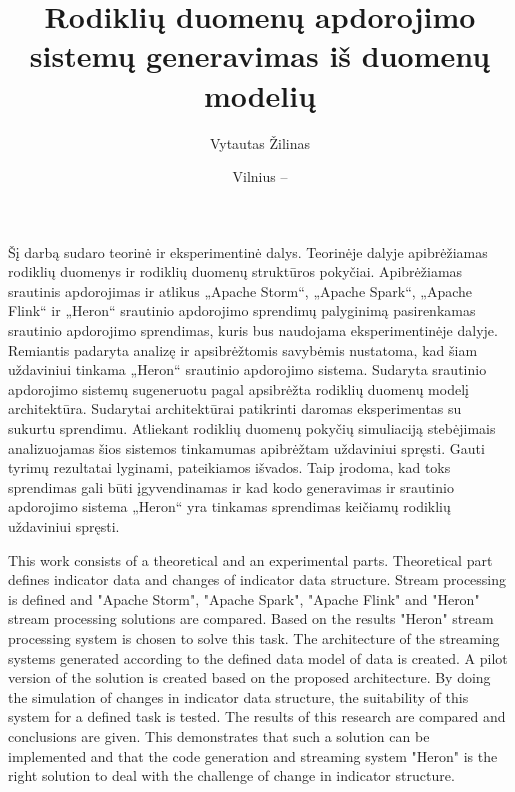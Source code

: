 \documentclass{VUMIFPSbakalaurinis}
\title{Rodiklių duomenų apdorojimo sistemų generavimas iš duomenų modelių}
\author{Vytautas Žilinas}
\date{Vilnius – \the\year}
\begin{document}
 
\maketitle

\cleardoublepage{}
\setcounter{page}{2}

Šį darbą sudaro teorinė ir eksperimentinė dalys. Teorinėje dalyje apibrėžiamas rodiklių duomenys ir rodiklių duomenų struktūros pokyčiai. Apibrėžiamas srautinis apdorojimas ir atlikus „Apache Storm“, „Apache Spark“, „Apache Flink“ ir „Heron“ srautinio apdorojimo sprendimų palyginimą pasirenkamas srautinio apdorojimo sprendimas, kuris bus naudojama eksperimentinėje dalyje. Remiantis padaryta analizę ir apsibrėžtomis savybėmis nustatoma, kad šiam uždaviniui tinkama „Heron“ srautinio apdorojimo sistema. Sudaryta srautinio apdorojimo sistemų sugeneruotu pagal apsibrėžta rodiklių duomenų modelį architektūra. Sudarytai architektūrai patikrinti daromas eksperimentas su sukurtu sprendimu. Atliekant rodiklių duomenų pokyčių simuliaciją stebėjimais analizuojamas šios sistemos tinkamumas apibrėžtam uždaviniui spręsti. Gauti tyrimų rezultatai lyginami, pateikiamos išvados. Taip įrodoma, kad toks sprendimas gali būti įgyvendinamas ir kad kodo generavimas ir srautinio apdorojimo sistema „Heron“ yra tinkamas sprendimas keičiamų rodiklių uždaviniui spręsti.

This work consists of a theoretical and an experimental parts. Theoretical part defines indicator data and changes of indicator data structure. Stream processing is defined and "Apache Storm", "Apache Spark", "Apache Flink" and "Heron" stream processing solutions are compared. Based on the results "Heron" stream processing system is chosen to solve this task. The architecture of the streaming systems generated according to the defined data model of data is created. A pilot version of the solution is created based on the proposed architecture. By doing the simulation of changes in indicator data structure, the suitability of this system for a defined task is tested. The results of this research are compared and conclusions are given. This demonstrates that such a solution can be implemented and that the code generation and streaming system "Heron" is the right solution to deal with the challenge of change in indicator structure.
\end{document}
